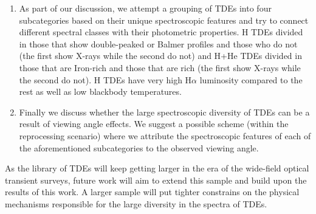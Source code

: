 \documentclass[structabstract]{aa}
\begin{document}
\begin{enumerate}[label={\arabic*.}]
\item As part of our discussion, we attempt a grouping of TDEs into four subcategories based on their unique spectroscopic features and try to connect different spectral classes with their photometric properties. H TDEs divided in those that show double-peaked or Balmer profiles and those who do not (the first show X-rays while the second do not) and H+He TDEs divided in those that are Iron-rich and those that are  rich (the first show X-rays while the second do not). H TDEs have very high H$\alpha$ luminosity compared to the rest as well as low blackbody temperatures. 
\item Finally we discuss whether the large spectroscopic diversity of TDEs can be a result of viewing angle effects. We suggest a possible scheme (within the reprocessing scenario) where we attribute the spectroscopic features of each of the aforementioned subcategories to the observed viewing angle. 
\end{enumerate}
As the library of TDEs will keep getting larger in the era of the wide-field optical transient surveys, future work will aim to extend this sample and build upon the results of this work. A larger sample will put tighter constrains on the physical mechanisms responsible for the large diversity in the spectra of TDEs.
\end{document}
